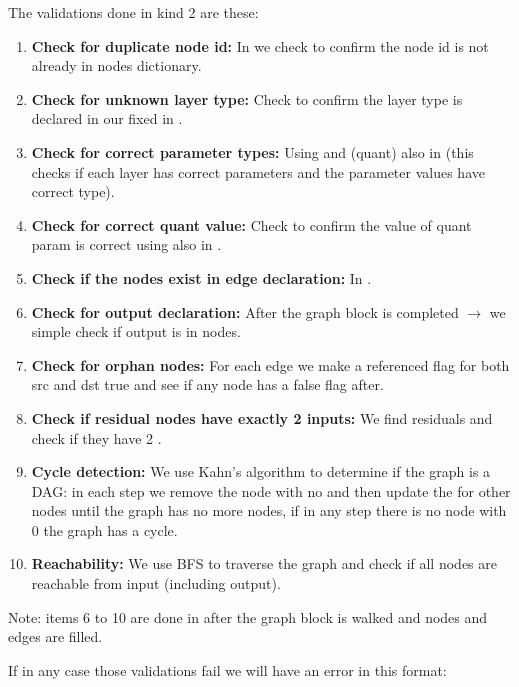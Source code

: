 \documentclass{nngraph-en}
\begin{document}
The validations done in kind 2 are these:
\begin{enumerate}
    \item \textbf{Check for duplicate node id:} In  we check to confirm the node id is not already in nodes dictionary.
    \item \textbf{Check for unknown layer type:} Check to confirm the layer type is declared in our fixed  in .
    \item \textbf{Check for correct parameter types:} Using  and  (quant) also in  (this checks if each layer has correct parameters and the parameter values have correct type).
    \item \textbf{Check for correct quant value:} Check to confirm the value of quant param is correct using  also in .
    \item \textbf{Check if the nodes exist in edge declaration:} In .
    \item \textbf{Check for output declaration:} After the graph block is completed $\rightarrow$ we simple check if output is in nodes.
    \item \textbf{Check for orphan nodes:} For each edge we make a referenced flag for both src and dst true and see if any node has a false flag after.
    \item \textbf{Check if residual nodes have exactly 2 inputs:} We find residuals and check if they have 2 .
    \item \textbf{Cycle detection:} We use Kahn's algorithm to determine if the graph is a DAG: in each step we remove the node with no  and then update the  for other nodes until the graph has no more nodes, if in any step there is no node with 0  the graph has a cycle.
    \item \textbf{Reachability:} We use BFS to traverse the graph and check if all nodes are reachable from input (including output).
\end{enumerate}

\begin{notebox}
Note: items 6 to 10 are done in  after the graph block is walked and nodes and edges are filled.
\end{notebox}

If in any case those validations fail we will have an error in this format:
\end{document}

